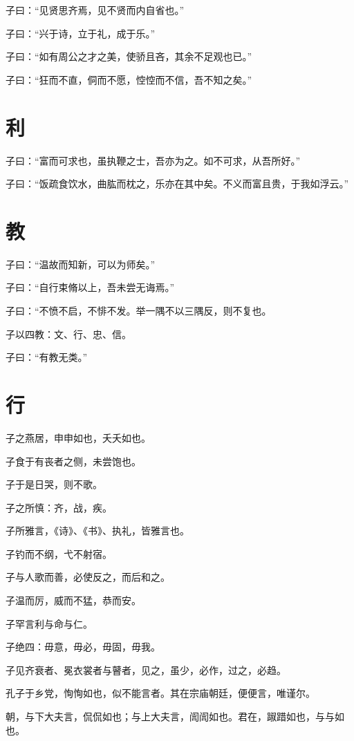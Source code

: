 \documentclass[a5paper]{ctexbook}
\begin{document}
    子曰：“见贤思齐焉，见不贤而内自省也。”

    子曰：“兴于诗，立于礼，成于乐。”

    子曰：“如有周公之才之美，使骄且吝，其余不足观也已。”

    子曰：“狂而不直，侗而不愿，悾悾而不信，吾不知之矣。”

    \chapter{利}

    子曰：“富而可求也，虽执鞭之士，吾亦为之。如不可求，从吾所好。”

    子曰：“饭疏食饮水，曲肱而枕之，乐亦在其中矣。不义而富且贵，于我如浮云。”

    \chapter{教}

    子曰：“温故而知新，可以为师矣。”

    子曰：“自行束脩以上，吾未尝无诲焉。”

    子曰：“不愤不启，不悱不发。举一隅不以三隅反，则不复也。

    子以四教：文、行、忠、信。

    子曰：“有教无类。”

    \chapter{行}

    子之燕居，申申如也，夭夭如也。

    子食于有丧者之侧，未尝饱也。

    子于是日哭，则不歌。

    子之所慎：齐，战，疾。

    子所雅言，《诗》、《书》、执礼，皆雅言也。

    子钓而不纲，弋不射宿。

    子与人歌而善，必使反之，而后和之。

    子温而厉，威而不猛，恭而安。

    子罕言利与命与仁。

    子绝四：毋意，毋必，毋固，毋我。

    子见齐衰者、冕衣裳者与瞽者，见之，虽少，必作，过之，必趋。

    孔子于乡党，恂恂如也，似不能言者。其在宗庙朝廷，便便言，唯谨尔。

    朝，与下大夫言，侃侃如也；与上大夫言，訚訚如也。君在，踧踖如也，与与如也。
\end{document}
